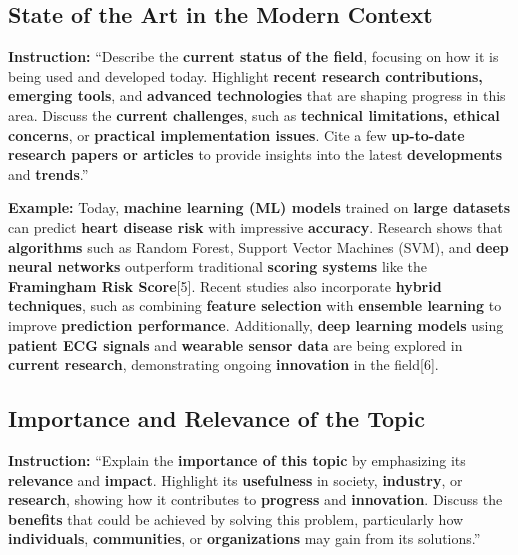 \subsection{State of the Art in the Modern Context} 

{\color{red} \textbf{  Instruction:} “Describe the \textbf{current status of the field}, focusing on how it is being used and developed today. Highlight \textbf{recent research contributions, emerging tools}, and \textbf{advanced technologies} that are shaping progress in this area. Discuss the \textbf{current challenges}, such as \textbf{technical limitations, ethical concerns}, or \textbf{practical implementation issues}. Cite a few \textbf{up-to-date research papers or articles} to provide insights into the latest \textbf{developments} and \textbf{trends}.”}

 \textbf{\color{blue} Example:} Today, \textbf{machine learning (ML) models} trained on \textbf{large datasets} can predict \textbf{heart disease risk} with impressive \textbf{accuracy}. Research shows that \textbf{algorithms} such as Random Forest, Support Vector Machines (SVM), and \textbf{deep neural networks} outperform traditional \textbf{scoring systems} like the \textbf{Framingham Risk Score}[5]. Recent studies also incorporate \textbf{hybrid techniques}, such as combining \textbf{feature selection} with \textbf{ensemble learning} to improve \textbf{prediction performance}. Additionally, \textbf{deep learning models} using \textbf{patient ECG signals} and \textbf{wearable sensor data} are being explored in \textbf{current research}, demonstrating ongoing \textbf{innovation} in the field[6].



\subsection{Importance and Relevance of the Topic}

{\color{red} \textbf{  Instruction:} 
“Explain the \textbf{importance of this topic} by emphasizing its \textbf{relevance} and \textbf{impact}. Highlight its \textbf{usefulness} in society, \textbf{industry}, or \textbf{research}, showing how it contributes to \textbf{progress} and \textbf{innovation}. Discuss the \textbf{benefits} that could be achieved by solving this problem, particularly how \textbf{individuals}, \textbf{communities}, or \textbf{organizations} may gain from its solutions.”}


